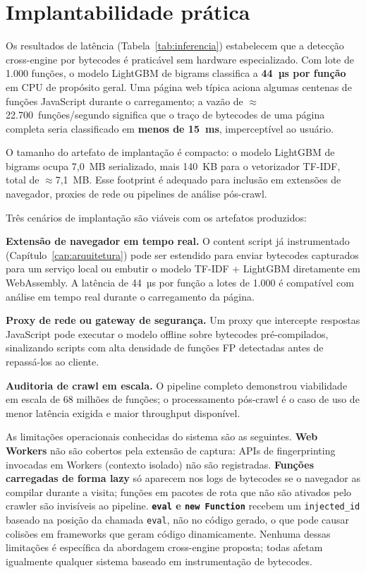 \section{Implantabilidade prática}
\label{sec:disc-implantacao}

Os resultados de latência (Tabela~\ref{tab:inferencia}) estabelecem que a detecção
cross-engine por bytecodes é praticável sem hardware especializado. Com lote de
1.000 funções, o modelo LightGBM de bigrams classifica a \textbf{44~µs por função}
em CPU de propósito geral. Uma página web típica aciona algumas centenas de funções
JavaScript durante o carregamento; a vazão de $\approx$22.700~funções/segundo
significa que o traço de bytecodes de uma página completa seria classificado em
\textbf{menos de 15~ms}, imperceptível ao usuário.

O tamanho do artefato de implantação é compacto: o modelo LightGBM de bigrams
ocupa 7,0~MB serializado, mais 140~KB para o vetorizador TF-IDF, total de
$\approx$7,1~MB. Esse footprint é adequado para inclusão em extensões de
navegador, proxies de rede ou pipelines de análise pós-crawl.

Três cenários de implantação são viáveis com os artefatos produzidos:

\textbf{Extensão de navegador em tempo real.} O content script já
instrumentado (Capítulo~\ref{cap:arquitetura}) pode ser estendido para enviar
bytecodes capturados para um serviço local ou embutir o modelo TF-IDF + LightGBM
diretamente em WebAssembly. A latência de 44~µs por função a lotes de 1.000 é
compatível com análise em tempo real durante o carregamento da página.

\textbf{Proxy de rede ou gateway de segurança.} Um proxy que intercepte respostas
JavaScript pode executar o modelo offline sobre bytecodes pré-compilados,
sinalizando scripts com alta densidade de funções FP detectadas antes de repassá-los
ao cliente.

\textbf{Auditoria de crawl em escala.} O pipeline completo demonstrou
viabilidade em escala de 68 milhões de funções; o processamento pós-crawl é
o caso de uso de menor latência exigida e maior throughput disponível.

As limitações operacionais conhecidas do sistema são as seguintes. \textbf{Web
Workers} não são cobertos pela extensão de captura: APIs de fingerprinting
invocadas em Workers (contexto isolado) não são registradas. \textbf{Funções carregadas de forma lazy} só aparecem
nos logs de bytecodes se o navegador as compilar durante a visita; funções em
pacotes de rota que não são ativados pelo crawler são invisíveis ao pipeline.
\textbf{\texttt{eval} e \texttt{new Function}} recebem um \texttt{injected\_id}
baseado na posição da chamada \texttt{eval}, não no código gerado, o que pode
causar colisões em frameworks que geram código dinamicamente. Nenhuma dessas
limitações é específica da abordagem cross-engine proposta; todas afetam igualmente
qualquer sistema baseado em instrumentação de bytecodes.
